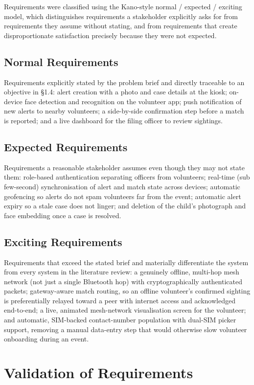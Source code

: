 \documentclass[12pt,a4paper,oneside]{report}
\begin{document}
Requirements were classified using the Kano-style normal / expected /
exciting model, which distinguishes requirements a stakeholder explicitly
asks for from requirements they assume without stating, and from
requirements that create disproportionate satisfaction precisely because
they were not expected.

\subsection{Normal Requirements}
Requirements explicitly stated by the problem brief and directly traceable
to an objective in \S1.4: alert creation with a photo and case details at
the kiosk; on-device face detection and recognition on the volunteer app;
push notification of new alerts to nearby volunteers; a side-by-side
confirmation step before a match is reported; and a live dashboard for the
filing officer to review sightings.

\subsection{Expected Requirements}
Requirements a reasonable stakeholder assumes even though they may not
state them: role-based authentication separating officers from volunteers;
real-time (sub few-second) synchronisation of alert and match state across
devices; automatic geofencing so alerts do not spam volunteers far from the
event; automatic alert expiry so a stale case does not linger; and deletion
of the child's photograph and face embedding once a case is resolved.

\subsection{Exciting Requirements}
Requirements that exceed the stated brief and materially differentiate the
system from every system in the literature review: a genuinely offline,
multi-hop mesh network (not just a single Bluetooth hop) with
cryptographically authenticated packets; gateway-aware match routing, so an
offline volunteer's confirmed sighting is preferentially relayed toward a
peer with internet access and acknowledged end-to-end; a live, animated
mesh-network visualisation screen for the volunteer; and automatic,
SIM-backed contact-number population with dual-SIM picker support, removing
a manual data-entry step that would otherwise slow volunteer onboarding
during an event.

\section{Validation of Requirements}
\end{document}
